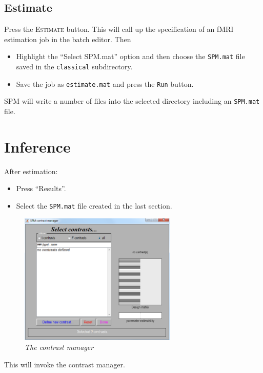 \subsection{Estimate}

Press the \textsc{Estimate} button. This will call up the specification of an fMRI estimation job in the batch editor. Then

\begin{itemize}
\item Highlight the ``Select SPM.mat'' option and then choose the \texttt{SPM.mat} file saved in the \texttt{classical} subdirectory.
\item Save the job as \texttt{estimate.mat} and press the \texttt{Run} button.
\end{itemize}

SPM will write a number of files into the selected directory including an \texttt{SPM.mat} file.

\section{Inference}

After estimation:

\begin{itemize}
\item Press ``Results''.
\item Select the \texttt{SPM.mat} file created in the last section.
\end{itemize}

\begin{figure}
\begin{center}
\includegraphics[width=75mm]{auditory/con_man}
\caption{\emph{The contrast manager}}
\end{center}
\end{figure}

This will invoke the contrast manager.

